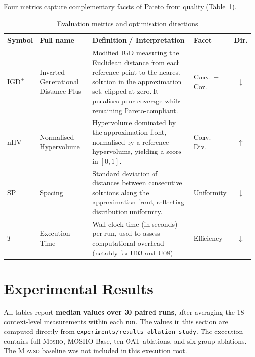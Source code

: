 \documentclass[11pt,a4paper]{article}
\newcommand{\mosho}{\textsc{Mosho}}
\newcommand{\mowso}{\textsc{Mowso}}
\begin{document}
Four metrics capture complementary facets of Pareto front quality
(Table~\ref{tab:metrics}).
\begin{table}[H]
\centering
\caption{Evaluation metrics and optimisation directions}
\label{tab:metrics}
\renewcommand{\arraystretch}{1.5} %

\begin{tabularx}{\linewidth}{@{} l >{\raggedright\arraybackslash}p{3.5cm} >{\raggedright\arraybackslash}X l c @{}}
\toprule
\textbf{Symbol} & \textbf{Full name} & \textbf{Definition / Interpretation} & \textbf{Facet} & \textbf{Dir.} \\
\midrule

$\mathrm{IGD}^+$ & 
Inverted Generational Distance Plus & 
Modified IGD measuring the Euclidean distance from each reference point to the nearest solution in the approximation set, clipped at zero. It penalises poor coverage while remaining Pareto-compliant. & 
Conv. + Cov. & $\downarrow$ \\ \addlinespace

$\mathrm{nHV}$ & 
Normalised Hypervolume & 
Hypervolume dominated by the approximation front, normalised by a reference hypervolume, yielding a score in $[0,1]$. & 
Conv. + Div. & $\uparrow$ \\ \addlinespace

$\mathrm{SP}$ & 
Spacing & 
Standard deviation of distances between consecutive solutions along the approximation front, reflecting distribution uniformity. & 
Uniformity & $\downarrow$ \\ \addlinespace

$T$ & 
Execution Time & 
Wall-clock time (in seconds) per run, used to assess computational overhead (notably for U03 and U08). & 
Efficiency & $\downarrow$ \\

\bottomrule
\end{tabularx}
\end{table}
\section{Experimental Results}
\label{sec:results}

All tables report \textbf{median values over 30 paired runs}, after
averaging the 18 context-level measurements within each run.  The values
in this section are computed directly from
\texttt{experiments/results\_ablation\_study}.  The execution contains
full \mosho{}, MOSHO-Base, ten OAT ablations, and six group ablations.
The \mowso{} baseline was not included in this execution root.
\end{document}
